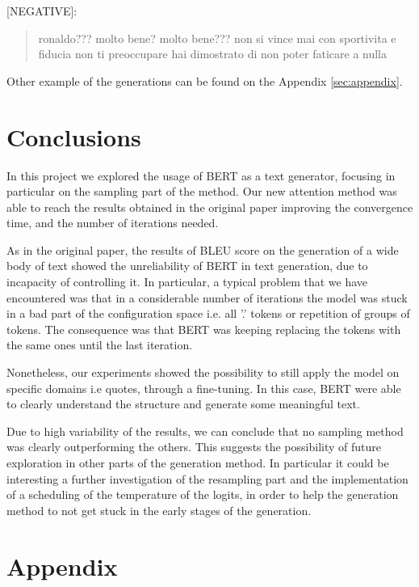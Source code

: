 \documentclass[10pt,twocolumn,letterpaper]{article}
\begin{document}
[NEGATIVE]:
\begin{quote}
   ronaldo??? molto bene? molto bene??? non si vince mai con sportivita e fiducia non ti preoccupare hai dimostrato di non poter faticare a nulla
\end{quote}

Other example of the generations can be found on the Appendix \ref{sec:appendix}.

\section{Conclusions}
In this project we explored the usage of BERT as a text generator,
focusing in particular on the sampling part of the method.
Our new attention method was able to reach the results obtained in the original paper
improving the convergence time, and the number of iterations needed.

As in the original paper, the results of BLEU score on the generation of a wide body of text
showed the unreliability of BERT in text generation,
due to incapacity of controlling it.
In particular, a typical problem that we have encountered was that in
a considerable number of iterations the model was stuck in a bad part of the
configuration space i.e. all '.' tokens or repetition of groups of tokens.
The consequence was that BERT was keeping replacing the tokens with the same ones
until the last iteration.

Nonetheless, our experiments showed the possibility to still apply the model
on specific domains i.e quotes, through a fine-tuning.
In this case, BERT were able to clearly understand
the structure and generate some meaningful text.

Due to high variability of the results, we can conclude that no sampling method was clearly
outperforming the others. This suggests the possibility of future exploration in other parts
of the generation method. In particular it could be interesting a further investigation
of the resampling part and the implementation of a scheduling of the temperature of the logits,
in order to help the generation method to not get stuck in the early stages of the generation.




\section*{Appendix}\label{sec:appendix}
\end{document}

